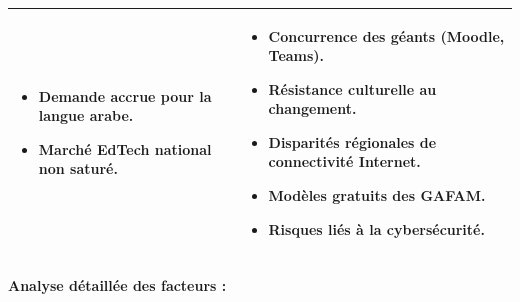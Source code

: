 \documentclass[12pt,a4paper,oneside]{report}
\begin{document}
\begin{table}[htbp]
\begin{tabularx}{\textwidth}{|X|X|}
\begin{itemize}
    \item Demande accrue pour la langue arabe.
    \item Marché EdTech national non saturé.
\end{itemize}
& 
\small
\begin{itemize}
    \item Concurrence des géants (Moodle, Teams).
    \item Résistance culturelle au changement.
    \item Disparités régionales de connectivité Internet.
    \item Modèles gratuits des GAFAM.
    \item Risques liés à la cybersécurité.
\end{itemize} \\
\hline
\end{tabularx}
\end{table}

\paragraph{Analyse détaillée des facteurs :}
\end{document}
